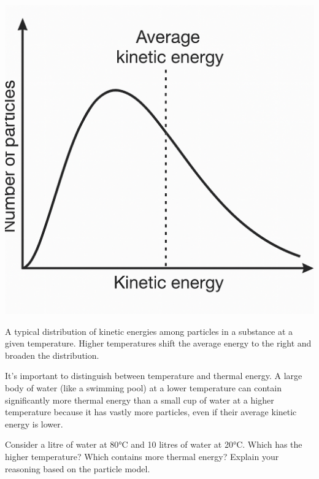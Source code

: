 
\begin{marginfigure}[-20pt] %
\includegraphics[width=\linewidth]{kinetic_energy.png} %
\caption{A typical distribution of kinetic energies among particles in a substance at a given temperature. Higher temperatures shift the average energy to the right and broaden the distribution.}
\label{fig:particle_distribution}
\end{marginfigure}

It's important to distinguish between temperature and thermal energy. A large body of water (like a swimming pool) at a lower temperature can contain significantly more thermal energy than a small cup of water at a higher temperature because it has vastly more particles, even if their average kinetic energy is lower.

\begin{stopandthink}
Consider a litre of water at 80°C and 10 litres of water at 20°C. Which has the higher temperature? Which contains more thermal energy? Explain your reasoning based on the particle model.
\end{stopandthink}

